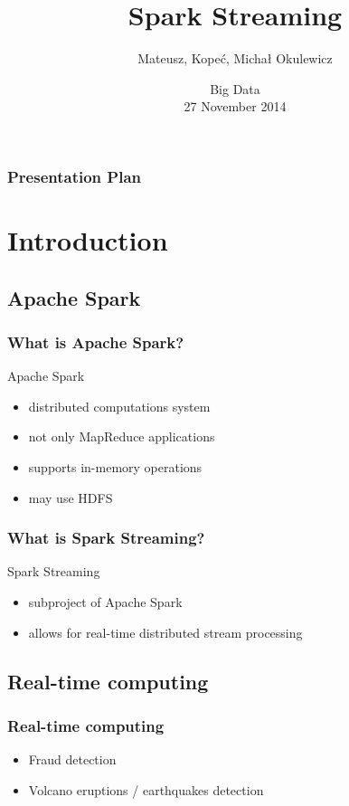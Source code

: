 \documentclass{beamer}
\title[Spark Streaming] %
{Spark Streaming}
\author %
{Mateusz, Kope{\'c}, Micha{\l} Okulewicz}
\institute %
{
Institute of Computer Science\\
Polish Academy of Sciences}
\date %
{Big Data \\27 November 2014}
\begin{document}
\begin{frame}
  \titlepage
\end{frame}

\begin{frame}
  \frametitle{Presentation Plan}
  \tableofcontents
\end{frame}

\section{Introduction}

\subsection*{Apache Spark\texttrademark}
\begin{frame}
\frametitle{What is Apache Spark\texttrademark?}

\begin{block}{Apache Spark\texttrademark}
\begin{itemize}
	\item distributed computations system
	\item not only MapReduce applications
	\item supports in-memory operations
	\item may use HDFS
\end{itemize}

\end{block}

\end{frame}

\begin{frame}
\frametitle{What is Spark Streaming?}

\begin{block}{Spark Streaming}
\begin{itemize}
	\item subproject of Apache Spark\texttrademark
	\item allows for real-time distributed stream processing
\end{itemize}

\end{block}

\end{frame}


\subsection*{Real-time computing}
\begin{frame}
\frametitle{Real-time computing}
	\begin{itemize}
		\item Fraud detection
		\item Volcano eruptions / earthquakes detection
	\end{itemize}
\end{frame}
\end{document}
